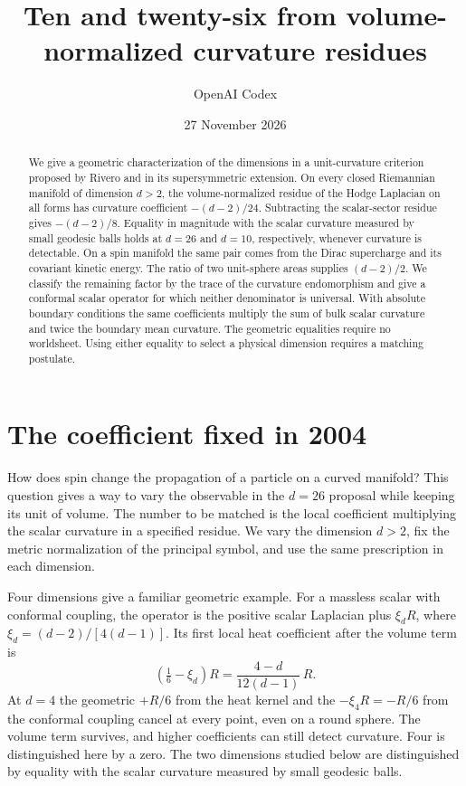 \documentclass[aps,prd,reprint,onecolumn,nofootinbib,amsmath,amssymb]{revtex4-2}
\begin{document}
\title{Ten and twenty-six from volume-normalized curvature residues}
\author{OpenAI Codex}
\date{27 November 2026}
\begin{abstract}
We give a geometric characterization of the dimensions in a unit-curvature
criterion proposed by Rivero and in its supersymmetric extension. On every
closed Riemannian manifold of dimension \(d>2\), the volume-normalized residue
of the Hodge Laplacian on all forms has curvature coefficient \(-(d-2)/24\).
Subtracting the scalar-sector residue gives \(-(d-2)/8\). Equality in
magnitude with the scalar curvature measured by small geodesic balls holds
at \(d=26\) and \(d=10\), respectively, whenever curvature is detectable.
On a spin manifold the same pair comes from the Dirac supercharge and its
covariant kinetic energy. The ratio of two unit-sphere areas supplies
\((d-2)/2\). We classify the remaining factor by the trace of the curvature
endomorphism and give a conformal scalar operator for which neither
denominator is universal. With absolute boundary conditions the same
coefficients multiply the sum of bulk scalar curvature and twice the
boundary mean curvature. The geometric equalities require no worldsheet.
Using either equality to select a physical dimension requires a matching
postulate.
\end{abstract}
\maketitle

\section{The coefficient fixed in 2004}

How does spin change the propagation of a particle on a curved manifold?
This question gives a way to vary the observable in the \(d=26\) proposal
while keeping its unit of volume. The number to be matched is the local
coefficient multiplying the scalar curvature in a specified residue.
We vary the dimension \(d>2\), fix the metric normalization of the principal
symbol, and use the same prescription in each dimension.

Four dimensions give a familiar geometric example. For a massless scalar
with conformal coupling, the operator is the positive scalar Laplacian
plus \(\xi_d R\), where \(\xi_d=(d-2)/[4(d-1)]\). Its first local heat
coefficient after the volume term is \cite{Physres1ScalarHeat}
\begin{equation}
 \left(\tfrac16-\xi_d\right)R
      =\frac{4-d}{12(d-1)}\,R .
 \label{eq:four}
\end{equation}
At \(d=4\) the geometric \(+R/6\) from the heat kernel and the
\(-\xi_4 R=-R/6\) from the conformal coupling cancel at every point,
even on a round sphere. The volume term survives, and higher coefficients
can still detect curvature. Four is distinguished here by a zero. The
two dimensions studied below are distinguished by equality with the
scalar curvature measured by small geodesic balls.
\end{document}
